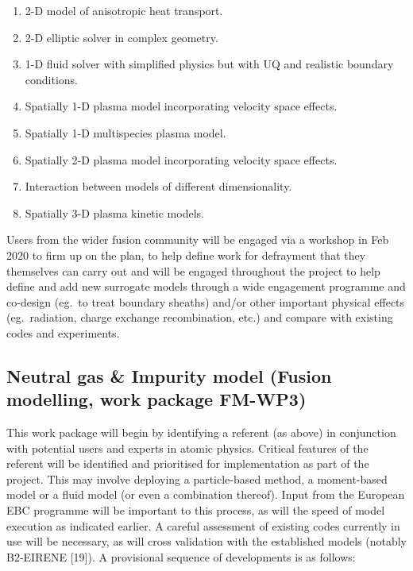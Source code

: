 \begin{enumerate}
\item 2-D model of anisotropic heat transport.

\item 2-D elliptic solver in complex geometry.

\item 1-D fluid solver with simplified physics but with UQ and realistic boundary conditions.

\item Spatially 1-D plasma model incorporating velocity space effects.

\item Spatially 1-D multispecies plasma model.

\item Spatially 2-D plasma model incorporating velocity space effects.

\item Interaction between models of different dimensionality.

\item Spatially 3-D plasma kinetic models.
\end{enumerate}

Users from the wider fusion community will be engaged via a workshop in Feb 2020 
to firm up on the plan, to help define work for defrayment that they themselves 
can carry out and will be engaged throughout the project to help define and add 
new surrogate models through a wide engagement programme and co-design (eg.\ to 
treat boundary sheaths) and/or other important physical effects (eg.\ radiation, 
charge exchange recombination, etc.) and compare with existing codes and experiments. 


\subsection*{\textbf{Neutral gas \& Impurity model}  (Fusion modelling, work package  \textbf{FM-WP3})}

This work package will begin by identifying a referent (as above) in conjunction 
with potential users and experts in atomic physics. Critical features of the referent 
will be identified and prioritised for implementation as part of the project. This 
may involve deploying a particle-based method, a moment-based model or a fluid 
model (or even a combination thereof). Input from the European EBC programme will 
be important to this process, as will the speed of model execution as indicated 
earlier. A careful assessment of existing codes currently in use will 
be necessary, as will cross validation with the established models (notably B2-EIRENE 
[19]). A provisional sequence of developments is as follows:

